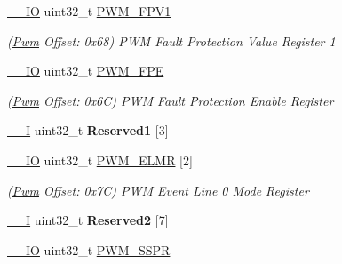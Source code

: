 \begin{DoxyCompactItemize}
\mbox{\label{structPwm_a4ed48cde0dfe14386ba64aeedcfe7b1b}} 
\mbox{\hyperlink{core__cm7_8h_aec43007d9998a0a0e01faede4133d6be}{\+\_\+\+\_\+\+IO}} uint32\+\_\+t \mbox{\hyperlink{structPwm_a4ed48cde0dfe14386ba64aeedcfe7b1b}{P\+W\+M\+\_\+\+F\+P\+V1}}
\begin{DoxyCompactList}\small\item\em (\mbox{\hyperlink{structPwm}{Pwm}} Offset\+: 0x68) P\+WM Fault Protection Value Register 1 \end{DoxyCompactList}\item 
\mbox{\label{structPwm_a89a77674da2327301735f8890839b60f}} 
\mbox{\hyperlink{core__cm7_8h_aec43007d9998a0a0e01faede4133d6be}{\+\_\+\+\_\+\+IO}} uint32\+\_\+t \mbox{\hyperlink{structPwm_a89a77674da2327301735f8890839b60f}{P\+W\+M\+\_\+\+F\+PE}}
\begin{DoxyCompactList}\small\item\em (\mbox{\hyperlink{structPwm}{Pwm}} Offset\+: 0x6C) P\+WM Fault Protection Enable Register \end{DoxyCompactList}\item 
\mbox{\label{structPwm_aa3b00e2354f768d5aaed42bcecd668b3}} 
\mbox{\hyperlink{core__cm7_8h_af63697ed9952cc71e1225efe205f6cd3}{\+\_\+\+\_\+I}} uint32\+\_\+t {\bfseries Reserved1} \mbox{[}3\mbox{]}
\item 
\mbox{\label{structPwm_acd8cc40caf90f10d23ba33008e2b4872}} 
\mbox{\hyperlink{core__cm7_8h_aec43007d9998a0a0e01faede4133d6be}{\+\_\+\+\_\+\+IO}} uint32\+\_\+t \mbox{\hyperlink{structPwm_acd8cc40caf90f10d23ba33008e2b4872}{P\+W\+M\+\_\+\+E\+L\+MR}} \mbox{[}2\mbox{]}
\begin{DoxyCompactList}\small\item\em (\mbox{\hyperlink{structPwm}{Pwm}} Offset\+: 0x7C) P\+WM Event Line 0 Mode Register \end{DoxyCompactList}\item 
\mbox{\label{structPwm_af139c633f6769f7c5bcb4a729ab79fb3}} 
\mbox{\hyperlink{core__cm7_8h_af63697ed9952cc71e1225efe205f6cd3}{\+\_\+\+\_\+I}} uint32\+\_\+t {\bfseries Reserved2} \mbox{[}7\mbox{]}
\item 
\mbox{\label{structPwm_a7999c9cc2034e2cd8082c307bc02e070}} 
\mbox{\hyperlink{core__cm7_8h_aec43007d9998a0a0e01faede4133d6be}{\+\_\+\+\_\+\+IO}} uint32\+\_\+t \mbox{\hyperlink{structPwm_a7999c9cc2034e2cd8082c307bc02e070}{P\+W\+M\+\_\+\+S\+S\+PR}}

\end{DoxyCompactItemize}
